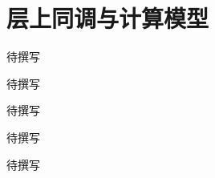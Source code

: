 
% 
% 

\chapter{层上同调与计算模型}
\label{g5:ch:18}

\begin{chapterabstract}
待撰写
\end{chapterabstract}

\begin{learninggoals}
待撰写
\end{learninggoals}

待撰写







\begin{chaptersummary}
待撰写
\end{chaptersummary}

\BookExercises
待撰写
